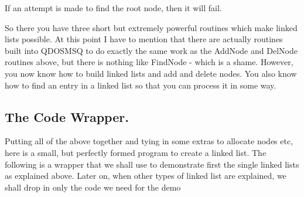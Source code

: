 If an attempt is made to find the root node, then it will
      fail.

So there you have three short but extremely powerful routines
      which make linked lists possible. At this point I have to mention that
      there are actually routines built into QDOSMSQ to do exactly the same
      work as the AddNode and DelNode routines above, but there is nothing
      like FindNode -{} which is a shame. However, you now know how to build
      linked lists and add and delete nodes. You also know how to find an
      entry in a linked list so that you can process it in some way.

\subsection{The Code Wrapper.}
\label{ch10-code-wrapper}%

Putting all of the above together and tying in some extras to
      allocate nodes etc, here is a small, but perfectly formed program to
      create a linked list. The following is a wrapper that we shall use to
      demonstrate first the single linked lists as explained above. Later on,
      when other types of linked list are explained, we shall drop in only the
      code we need for the demo


